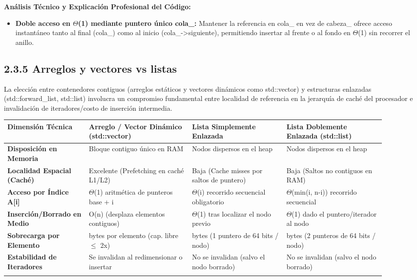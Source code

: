 \documentclass[11pt,letterpaper]{article}
\begin{document}
\noindent\textbf{\color{ipnguinda}Análisis Técnico y Explicación Profesional del Código:}\par\vspace{-2pt}
\begin{itemize}
\setlength{\itemsep}{2pt}\setlength{\parskip}{0pt}
  \item \textbf{Doble acceso en $\Theta$(1) mediante puntero único cola\_: }Mantener la referencia en cola\_ en vez de cabeza\_ ofrece acceso instantáneo tanto al final (cola\_) como al inicio (cola\_->siguiente), permitiendo insertar al frente o al fondo en $\Theta$(1) sin recorrer el anillo.
\end{itemize}
\subsection*{2.3.5 Arreglos y vectores vs listas}
La elección entre contenedores contiguos (arreglos estáticos y vectores dinámicos como std::vector) y estructuras enlazadas (std::forward\_list, std::list) involucra un compromiso fundamental entre localidad de referencia en la jerarquía de caché del procesador e invalidación de iteradores/costo de inserción intermedia.\par
\vspace{4pt}\noindent
\begin{tabular}{>{\raggedright\arraybackslash}p{0.194\linewidth}>{\raggedright\arraybackslash}p{0.249\linewidth}>{\raggedright\arraybackslash}p{0.222\linewidth}>{\raggedright\arraybackslash}p{0.235\linewidth}}
\toprule
\textbf{\color{ipnguinda}Dimensión Técnica} & \textbf{\color{ipnguinda}Arreglo / Vector Dinámico (std::vector)} & \textbf{\color{ipnguinda}Lista Simplemente Enlazada} & \textbf{\color{ipnguinda}Lista Doblemente Enlazada (std::list)} \\
\midrule
\textbf{Disposición en Memoria} & Bloque contiguo único en RAM & Nodos dispersos en el heap & Nodos dispersos en el heap \\
\addlinespace[3pt]
\textbf{Localidad Espacial (Caché)} & Excelente (Prefetching en caché L1/L2) & Baja (Cache misses por saltos de puntero) & Baja (Saltos no contiguos en RAM) \\
\addlinespace[3pt]
\textbf{Acceso por Índice A[i]} & $\Theta$(1) aritmética de punteros base + i & $\Theta$(i) recorrido secuencial obligatorio & $\Theta$(min(i, n-i)) recorrido secuencial \\
\addlinespace[3pt]
\textbf{Inserción/Borrado en Medio} & O(n) (desplaza elementos contiguos) & $\Theta$(1) tras localizar el nodo previo & $\Theta$(1) dado el puntero/iterador al nodo \\
\addlinespace[3pt]
\textbf{Sobrecarga por Elemento} & 0 bytes por elemento (cap. libre $\le$ 2x) & 8 bytes (1 puntero de 64 bits / nodo) & 16 bytes (2 punteros de 64 bits / nodo) \\
\addlinespace[3pt]
\textbf{Estabilidad de Iteradores} & Se invalidan al redimensionar o insertar & No se invalidan (salvo el nodo borrado) & No se invalidan (salvo el nodo borrado) \\
\addlinespace[3pt]
\bottomrule
\end{tabular}
\end{document}
